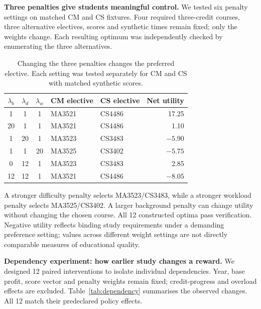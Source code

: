 \documentclass{article}
\begin{document}
\newpage
\textbf{Three penalties give students meaningful control.} We tested six penalty settings on matched CM and CS fixtures. Four required three-credit courses, three alternative electives, scores and synthetic times remain fixed; only the weights change. Each resulting optimum was independently checked by enumerating the three alternatives.

\begin{table}[H]
\centering\small
\caption{Changing the three penalties changes the preferred elective. Each setting was tested separately for CM and CS with matched synthetic scores.}
\begin{tabular}{cccp{1.05in}p{1.05in}r}
\toprule
$\lambda_b$ & $\lambda_d$ & $\lambda_w$ & CM elective & CS elective & Net utility\\
\midrule
1 & 1 & 1 & MA3521 & CS4486 & 17.25\\
20 & 1 & 1 & MA3521 & CS4486 & 1.10\\
1 & 20 & 1 & MA3523 & CS3483 & $-5.90$\\
1 & 1 & 20 & MA3525 & CS3402 & $-5.75$\\
0 & 12 & 1 & MA3523 & CS3483 & 2.85\\
12 & 12 & 1 & MA3521 & CS4486 & $-8.05$\\
\bottomrule
\end{tabular}
\label{tab:lambda}
\end{table}

A stronger difficulty penalty selects MA3523/CS3483, while a stronger workload penalty selects MA3525/CS3402. A larger background penalty can change utility without changing the chosen course. All 12 constructed optima pass verification. Negative utility reflects binding study requirements under a demanding preference setting; values across different weight settings are not directly comparable measures of educational quality.

\textbf{Dependency experiment: how earlier study changes a reward.} We designed 12 paired interventions to isolate individual dependencies. Year, base profit, score vector and penalty weights remain fixed; credit-progress and overload effects are excluded. Table~\ref{tab:dependency} summarises the observed changes. All 12 match their predeclared policy effects.
\end{document}
